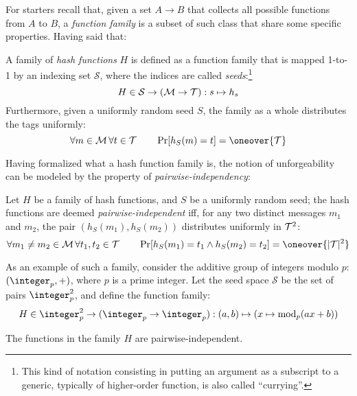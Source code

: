 For starters recall that, given a set $A \to B$ that collects all possible functions from $A$ to $B$, a \emph{function family} is a subset of such class that share some specific properties. Having said that:

\begin{definition}
    A family of \emph{hash functions} $H$ is defined as a function family that is mapped 1-to-1 by an indexing set $\mathcal{S}$, where the indices are called \emph{seeds}:\footnote{This kind of notation consisting in putting an argument as a subscript to a generic, typically of higher-order function, is also called ``currying''.}
    \[
        H \in \mathcal{S} \to (\mathcal{M} \to \mathcal{T}) : s \mapsto h_s
    \]
    Furthermore, given a uniformly random seed $S$, the family as a whole distributes the tags uniformly:
    \[
        \forall m \in \M \, \forall t \in \T \qquad \Pr[h_S(m) = t] = \oneover{\T}
    \]
\end{definition}

Having formalized what a hash function family is, the notion of unforgeability can be modeled by the property of \emph{pairwise-independency}:

\begin{definition}
    Let $H$ be a family of hash functions, and $S$ be a uniformly random seed; the hash functions are deemed \emph{pairwise-independent} iff, for any two distinct messages $m_1$ and $m_2$, the pair $(h_S(m_1), h_S(m_2))$ distributes uniformly in $\mathcal{T}^2$:
    \[
        \forall m_1 \neq m_2 \in \M \, \forall t_1, t_2 \in \T \qquad \Pr[h_S(m_1) = t_1 \wedge h_S(m_2) = t_2] = \oneover{|\T|^2}
    \]
\end{definition}

As an example of such a family, consider the additive group of integers modulo $p$: $(\integer_p, +)$, where $p$ is a prime integer. Let the seed space $\mathcal{S}$ be the set of pairs $\integer_p^2$, and define the function family:
\[
    H \in \integer_p^2 \to (\integer_p \to \integer_p) : (a, b) \mapsto (x \mapsto \textrm{\textup{mod}}_p(ax + b))
\]

\begin{proposition}
    The functions in the family $H$ are pairwise-independent.
\end{proposition}

